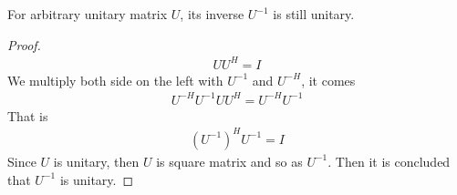 \documentclass[11pt,a4paper]{article}
\begin{document}
\begin{lemma}
    For arbitrary unitary matrix $U$, its inverse $U^{-1}$ is still unitary. 
\end{lemma}
\begin{proof}
    \begin{align}
        U U^H = I
    \end{align}
    We multiply both side on the left with $U^{-1}$ and $U^{-H}$, it comes
    \begin{align}
        U^{-H} U^{-1} U U^H = U^{-H} U^{-1}
    \end{align}
    That is 
    \begin{align}
        (U^{-1})^H U^{-1} = I
    \end{align}
    Since $U$ is unitary, then $U$ is square matrix and so as $U^{-1}$.
    Then it is concluded that $U^{-1}$ is unitary.
\end{proof}
\end{document}
